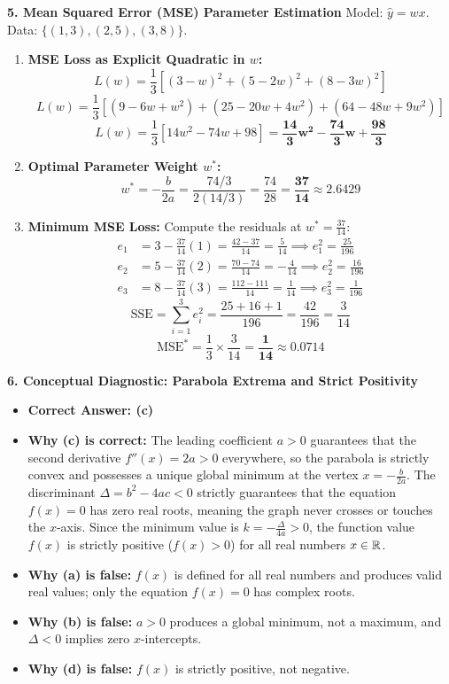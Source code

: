 \textbf{5. Mean Squared Error (MSE) Parameter Estimation}
Model: $\hat{y} = w x$. Data: $\{(1, 3), (2, 5), (3, 8)\}$.
\begin{enumerate}
    \item \textbf{MSE Loss as Explicit Quadratic in $w$:}
    $$L(w) = \frac{1}{3} \left[ (3 - w)^2 + (5 - 2w)^2 + (8 - 3w)^2 \right]$$
    $$L(w) = \frac{1}{3} \left[ (9 - 6w + w^2) + (25 - 20w + 4w^2) + (64 - 48w + 9w^2) \right]$$
    $$L(w) = \frac{1}{3} \left[ 14w^2 - 74w + 98 \right] = \mathbf{\frac{14}{3}w^2 - \frac{74}{3}w + \frac{98}{3}}$$
    \item \textbf{Optimal Parameter Weight $w^*$:}
    $$w^* = -\frac{b}{2a} = \frac{74/3}{2(14/3)} = \frac{74}{28} = \mathbf{\frac{37}{14} \approx 2.6429}$$
    \item \textbf{Minimum MSE Loss:}
    Compute the residuals at $w^* = \frac{37}{14}$:
    \begin{align*}
        e_1 &= 3 - \frac{37}{14}(1) = \frac{42 - 37}{14} = \frac{5}{14} \implies e_1^2 = \frac{25}{196} \\
        e_2 &= 5 - \frac{37}{14}(2) = \frac{70 - 74}{14} = -\frac{4}{14} \implies e_2^2 = \frac{16}{196} \\
        e_3 &= 8 - \frac{37}{14}(3) = \frac{112 - 111}{14} = \frac{1}{14} \implies e_3^2 = \frac{1}{196}
    \end{align*}
    $$\text{SSE} = \sum_{i=1}^3 e_i^2 = \frac{25 + 16 + 1}{196} = \frac{42}{196} = \frac{3}{14}$$
    $$\text{MSE}^* = \frac{1}{3} \times \frac{3}{14} = \mathbf{\frac{1}{14} \approx 0.0714}$$
\end{enumerate}

\textbf{6. Conceptual Diagnostic: Parabola Extrema and Strict Positivity}
\begin{itemize}
    \item \textbf{Correct Answer: (c)}
    \item \textbf{Why (c) is correct:} The leading coefficient $a > 0$ guarantees that the second derivative $f''(x) = 2a > 0$ everywhere, so the parabola is strictly convex and possesses a unique global minimum at the vertex $x = -\frac{b}{2a}$. The discriminant $\Delta = b^2 - 4ac < 0$ strictly guarantees that the equation $f(x) = 0$ has zero real roots, meaning the graph never crosses or touches the $x$-axis. Since the minimum value is $k = -\frac{\Delta}{4a} > 0$, the function value $f(x)$ is strictly positive ($f(x) > 0$) for all real numbers $x \in \mathbb{R}$.
    \item \textbf{Why (a) is false:} $f(x)$ is defined for all real numbers and produces valid real values; only the equation $f(x) = 0$ has complex roots.
    \item \textbf{Why (b) is false:} $a > 0$ produces a global minimum, not a maximum, and $\Delta < 0$ implies zero $x$-intercepts.
    \item \textbf{Why (d) is false:} $f(x)$ is strictly positive, not negative.
\end{itemize}

